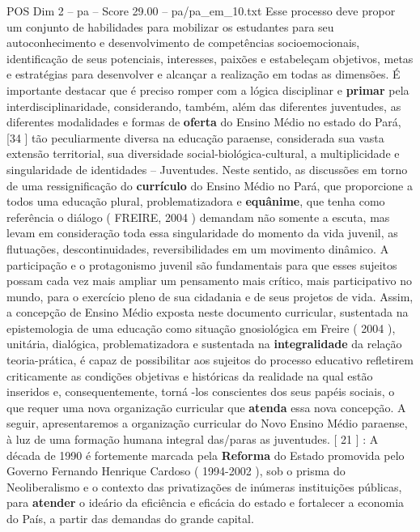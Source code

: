 \begin{textsample}{POS Dim 2 – pa – Score 29.00 – pa/pa\_em\_10.txt}
Esse processo deve propor um conjunto de habilidades para mobilizar os estudantes para seu autoconhecimento e desenvolvimento de competências socioemocionais, identificação de seus potenciais, interesses, paixões e estabeleçam objetivos, metas e estratégias para desenvolver e alcançar a realização em todas as dimensões.
É importante destacar que é preciso romper com a lógica disciplinar e \textbf{primar} pela interdisciplinaridade, considerando, também, além das diferentes juventudes, as diferentes modalidades e formas de \textbf{oferta} do Ensino Médio no estado do Pará,[34 ] tão peculiarmente diversa na educação paraense, considerada sua vasta extensão territorial, sua diversidade social-biológica-cultural, a multiplicidade e singularidade de identidades – Juventudes.
Neste sentido, as discussões em torno de uma ressignificação do \textbf{currículo} do Ensino Médio no Pará, que proporcione a todos uma educação plural, problematizadora e \textbf{equânime}, que tenha como referência o diálogo ( FREIRE, 2004 ) demandam não somente a escuta, mas levam em consideração toda essa singularidade do momento da vida juvenil, as flutuações, descontinuidades, reversibilidades em um movimento dinâmico.
A participação e o protagonismo juvenil são fundamentais para que esses sujeitos possam cada vez mais ampliar um pensamento mais crítico, mais participativo no mundo, para o exercício pleno de sua cidadania e de seus projetos de vida.
Assim, a concepção de Ensino Médio exposta neste documento curricular, sustentada na epistemologia de uma educação como situação gnosiológica em Freire ( 2004 ), unitária, dialógica, problematizadora e sustentada na \textbf{integralidade} da relação teoria-prática, é capaz de possibilitar aos sujeitos do processo educativo refletirem criticamente as condições objetivas e históricas da realidade na qual estão inseridos e, consequentemente, torná -los conscientes dos seus papéis sociais, o que requer uma nova organização curricular que \textbf{atenda} essa nova concepção.
A seguir, apresentaremos a organização curricular do Novo Ensino Médio paraense, à luz de uma formação humana integral das/paras as juventudes. [ 21 ] : A década de 1990 é fortemente marcada pela \textbf{Reforma} do Estado promovida pelo Governo Fernando Henrique Cardoso ( 1994-2002 ), sob o prisma do Neoliberalismo e o contexto das privatizações de inúmeras instituições públicas, para \textbf{atender} o ideário da eficiência e eficácia do estado e fortalecer a economia do País, a partir das demandas do grande capital.

\end{textsample}

